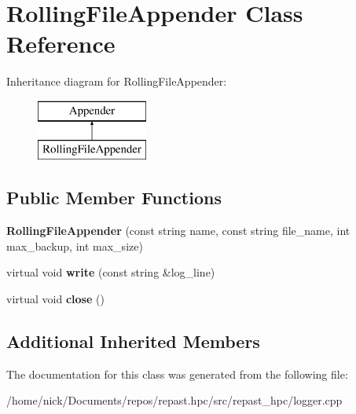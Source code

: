 \hypertarget{class_rolling_file_appender}{\section{Rolling\-File\-Appender Class Reference}
\label{class_rolling_file_appender}
}
Inheritance diagram for Rolling\-File\-Appender\-:\begin{figure}[H]
\begin{center}
\leavevmode
\includegraphics[height=2.000000cm]{class_rolling_file_appender}
\end{center}
\end{figure}
\subsection*{Public Member Functions}
\begin{DoxyCompactItemize}
\item 
\hypertarget{class_rolling_file_appender_ad064edb9a9a56abe1bb8d2c99551c32f}{{\bfseries Rolling\-File\-Appender} (const string name, const string file\-\_\-name, int max\-\_\-backup, int max\-\_\-size)}\label{class_rolling_file_appender_ad064edb9a9a56abe1bb8d2c99551c32f}

\item 
\hypertarget{class_rolling_file_appender_a8e4a0abe8891bd2e28aa8b39e92c0435}{virtual void {\bfseries write} (const string \&log\-\_\-line)}\label{class_rolling_file_appender_a8e4a0abe8891bd2e28aa8b39e92c0435}

\item 
\hypertarget{class_rolling_file_appender_a123c83a1000ca9cd0f40fe747c816bcc}{virtual void {\bfseries close} ()}\label{class_rolling_file_appender_a123c83a1000ca9cd0f40fe747c816bcc}

\end{DoxyCompactItemize}
\subsection*{Additional Inherited Members}


The documentation for this class was generated from the following file\-:\begin{DoxyCompactItemize}
\item 
/home/nick/\-Documents/repos/repast.\-hpc/src/repast\-\_\-hpc/logger.\-cpp\end{DoxyCompactItemize}
